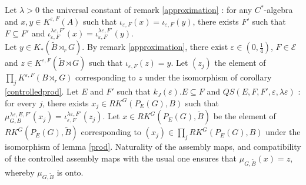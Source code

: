 \begin{dem}
Let $\lambda>0$ the universal constant of remark \ref{approximation} : for any $C^*$-algebra and $x,y\in K^{\varepsilon, F}(A)$ such that $\iota_{\varepsilon,F} (x) =\iota_{\varepsilon,F}(y)$, there exists $F'$ such that $F\subseteq F'$ and $\iota_{\varepsilon,F}^{\lambda\varepsilon,F'} (x) =\iota_{\varepsilon,F}^{\lambda\varepsilon,F'} (y)$.\\


Let $y\in K_*(\tilde B\rtimes_r G)$. By remark \ref{approximation}, there exist $\varepsilon\in (0,\frac{1}{4})$, $F\in\mathcal E$ and $z\in K^{\varepsilon,F}(\tilde B\rtimes G)$ such that $\iota_{\varepsilon,F}(z) = y$. Let $(z_j)$ the element of $\prod_j K^{\varepsilon,F}(B\rtimes_r G)$ corresponding to $z$ under the isomorphism of corollary \ref{controlledprod}. Let $E$ and $F'$ such that $k_J(\varepsilon).E\subseteq F$ and $QS(E,F,F',\varepsilon,\lambda\varepsilon)$ : for every $j$, there exists $x_j\in RK^G(P_E(G),B) $ such that $\mu_{G,B}^{\lambda\varepsilon,E,F'}(x_j)=\iota_{\varepsilon,F}^{\lambda\varepsilon,F'}(z_j)$. 
Let $x\in RK^G(P_E(G),\tilde B)$ be the element of $RK^G(P_E(G),\tilde B)$ corresponding to $(x_j)\in \prod_j RK^G(P_E(G),B)$ under the isomorphism of lemma \ref{prod}. Naturality of the assembly maps, and compatibility of the controlled assembly maps with the usual one ensures that $\mu_{G,\tilde B}(x)=z$, whereby $\mu_{G,\tilde B}$ is onto.\\


\end{dem}
